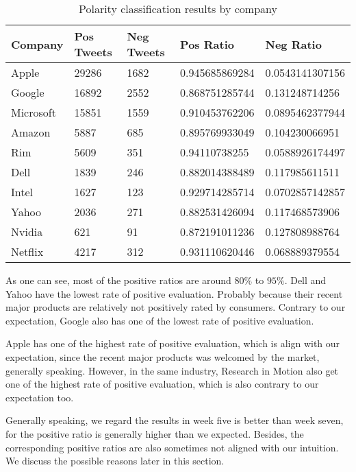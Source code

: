 \documentclass[12pt]{article}
\begin{document}
\begin{table}
\begin{center}
    \begin{tabular}{ | l || l | l | l | l | }
        \hline
        \textbf{Company} &  \textbf{Pos Tweets} & \textbf{Neg Tweets} & \textbf{Pos Ratio} & \textbf{Neg Ratio} \\ \hline
        \hline
        Apple &  29286 & 1682 & 0.945685869284 & 0.0543141307156 \\ \hline
        Google &  16892 & 2552 & 0.868751285744 & 0.131248714256 \\ \hline
        Microsoft &  15851 & 1559 & 0.910453762206 & 0.0895462377944 \\ \hline
        Amazon &  5887 & 685 & 0.895769933049 & 0.104230066951 \\ \hline
        Rim &  5609 & 351 & 0.94110738255 & 0.0588926174497 \\ \hline
        Dell &  1839 & 246 & 0.882014388489 & 0.117985611511 \\ \hline
        Intel &  1627 & 123 & 0.929714285714 & 0.0702857142857 \\ \hline
        Yahoo &  2036 & 271 & 0.882531426094 & 0.117468573906 \\ \hline
        Nvidia &  621 & 91 & 0.872191011236 & 0.127808988764 \\ \hline
        Netflix &  4217 & 312 & 0.931110620446 & 0.068889379554 \\ \hline
    \end{tabular}
\caption{Polarity classification results by company}
\label{polarity-by-company}
\end{center}
\end{table}

As one can see, most of the positive ratios are around $80\%$ to $95\%$. Dell and Yahoo have the lowest rate of positive evaluation. Probably because their recent major products are relatively not positively rated by consumers. Contrary to our expectation, Google also has one of the lowest rate of positive evaluation.

Apple has one of the highest rate of positive evaluation, which is align with our expectation, since the recent major products was welcomed by the market, generally speaking. However, in the same industry, Research in Motion also get one of the highest rate of positive evaluation, which is also contrary to our expectation too.

Generally speaking, we regard the results in week five is better than week seven, for the positive ratio is generally higher than we expected. Besides, the corresponding positive ratios are also sometimes not aligned with our intuition. We discuss the possible reasons later in this section.
\end{document}
